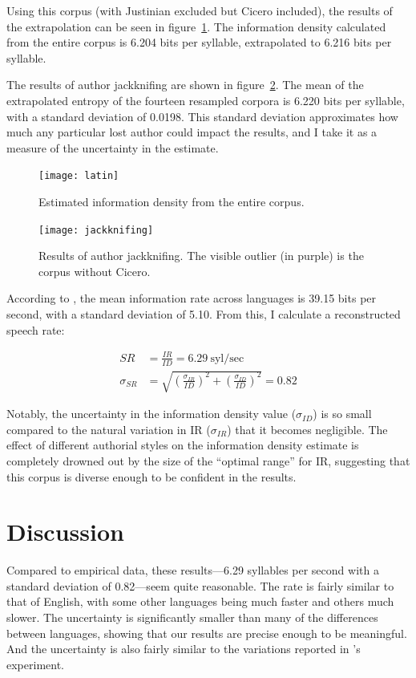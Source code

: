 \documentclass[12pt,twoside]{article}
\begin{document}
Using this corpus (with Justinian excluded but Cicero included), the results of the extrapolation can be seen in figure~\ref{fig:results}. The information density calculated from the entire corpus is 6.204 bits per syllable, extrapolated to 6.216 bits per syllable.

The results of author jackknifing are shown in figure~\ref{fig:jackknifing}. The mean of the extrapolated entropy of the fourteen resampled corpora is 6.220 bits per syllable, with a standard deviation of 0.0198. This standard deviation approximates how much any particular lost author could impact the results, and I take it as a measure of the uncertainty in the estimate.

\begin{figure}[p]
\centering
\caption{Estimated information density from the entire corpus.}
\label{fig:results}
\noindent\texttt{[image: latin]}
\end{figure}

\begin{figure}[p]
\centering
\caption{Results of author jackknifing. The visible outlier (in purple) is the corpus without Cicero.}
\label{fig:jackknifing}
\noindent\texttt{[image: jackknifing]}
\end{figure}

According to \citet{coupé}, the mean information rate across languages is 39.15 bits per second, with a standard deviation of 5.10. From this, I calculate a reconstructed speech rate:

\begin{align}
SR &= \frac{IR}{ID} = 6.29\:\textrm{syl/sec} \\
\sigma_{SR} &= \sqrt{\left(\frac{\sigma_{IR}}{ID}\right)^2 + \left(\frac{\sigma_{ID}}{ID}\right)^2} = 0.82
\end{align}

Notably, the uncertainty in the information density value (\(\sigma_{ID}\)) is so small compared to the natural variation in IR (\(\sigma_{IR}\)) that it becomes negligible. The effect of different authorial styles on the information density estimate is completely drowned out by the size of the ``optimal range'' for IR, suggesting that this corpus is diverse enough to be confident in the results.

\section{Discussion}
\label{sec:disc}

Compared to  empirical data, these results---6.29 syllables per second with a standard deviation of 0.82---seem quite reasonable. The rate is fairly similar to that of English, with some other languages being much faster and others much slower. The uncertainty is significantly smaller than many of the differences between languages, showing that our results are precise enough to be meaningful. And the uncertainty is also fairly similar to the variations reported in \citeauthor{coupé}'s experiment.
\end{document}

